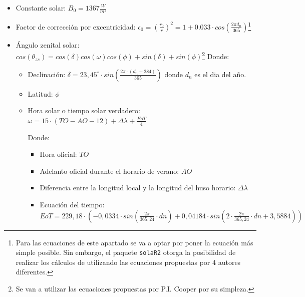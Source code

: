 \begin{itemize}
\item Constante solar: \(B_0=1367\frac{W}{m^2}\) 
\item Factor de corrección por excentricidad: \(\epsilon_0=(\frac{r_0}{r})^2=1+0.033\cdot cos(\frac{2\pi d_n}{365})\)\footnote{Para las ecuaciones de este apartado se va a optar por poner la ecuación más simple posible. Sin embargo, el paquete \texttt{solaR2} otorga la posibilidad de realizar los cálculos de utilizando las ecuaciones propuestas por 4 autores diferentes.} 
\item Ángulo zenital solar: \(cos(\theta_{zs})=cos(\delta)cos(\omega)cos(\phi)+sin(\delta)+sin(\phi)\)\footnote{Se van a utilizar las ecuaciones propuestas por P.I. Cooper \cite{Cooper1969} por su simpleza.}
Donde:
\begin{itemize}
\item Declinación: \(\delta =23,45^\circ \cdot sin(\frac{2\pi \cdot (d_n+284)}{365})\) 
donde \(d_n\) es el dia del año. 
\item Latitud: \(\phi\) 
\item Hora solar o tiempo solar verdadero: \(\omega = 15\cdot (TO-AO-12)+\Delta \lambda +\frac{EoT}{4}\) 

Donde:
\begin{itemize}
\item Hora oficial: \(TO\) 
\item Adelanto oficial durante el horario de verano: \(AO\) 
\item Diferencia entre la longitud local y la longitud del huso horario: \(\Delta \lambda\) 
\item Ecuación del tiempo: \(EoT=229,18\cdot (-0,0334\cdot sin(\frac{2\pi}{365,24}\cdot dn)+0,04184\cdot sin(2\cdot \frac{2\pi}{365,24}\cdot dn+3,5884))\) 
\end{itemize}
\end{itemize}
\end{itemize}

